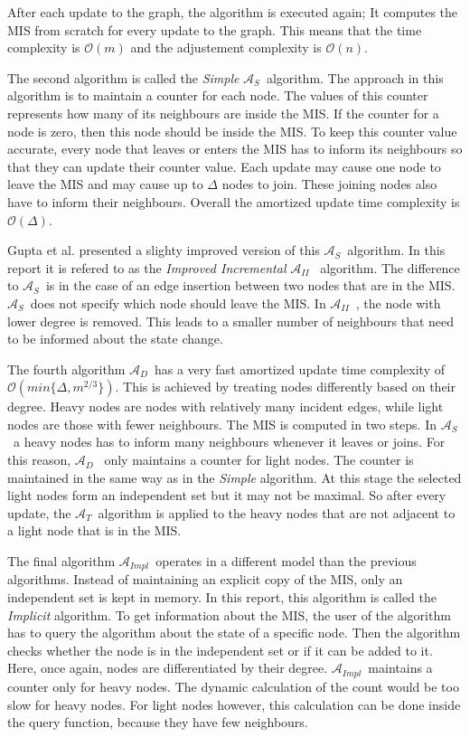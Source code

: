 \documentclass[letterpaper,11pt]{article}
\newcommand{\trivial}{$\mathcal{A}_T$\ }
\newcommand{\simple}{$\mathcal{A}_S$\ }
\newcommand{\improvedinc}{$\mathcal{A}_{II}$\ }
\newcommand{\dynamic}{$\mathcal{A}_{D}$\ }
\newcommand{\implicit}{$\mathcal{A}_{Impl}$\ }
\newcommand{\OD}{$\mathcal{O}(\Delta)$}
\begin{document}

After each update to the graph, the algorithm is executed again; It computes the
MIS from scratch for every update to the graph. This means that the time
complexity is $\mathcal{O}(m)$ and the adjustement complexity is
$\mathcal{O}(n)$.

The second algorithm is called the \textit{Simple} \simple algorithm. The
approach in this algorithm is to maintain a counter for each node. The values of
this counter represents how many of its neighbours are inside the MIS. If the
counter for a node is zero, then this node should be inside the MIS. To keep
this counter value accurate, every node that leaves or enters the MIS has to
inform its neighbours so that they can update their counter value. Each update
may cause one node to leave the MIS and may cause up to $\Delta$ nodes to join.
These joining nodes also have to inform their neighbours. Overall the amortized update
time complexity is \OD.

Gupta et al. presented a slighty improved version of this \simple algorithm. In
this report it is refered to as the \textit{Improved Incremental} \improvedinc
algorithm. The difference to \simple is in the case of an edge insertion between
two nodes that are in the MIS. \simple does not specify which node should leave
the MIS. In \improvedinc, the node with lower degree is removed. This leads to
a smaller number of neighbours that need to be informed about the state change.

The fourth algorithm \dynamic has a very fast amortized update time complexity
of \linebreak $\mathcal{O}(min\{\Delta, m^{2/3}\})$. This is achieved by
treating nodes differently based on their degree. Heavy nodes are nodes with
relatively many incident edges, while light nodes are those with fewer
neighbours. The MIS is computed in two steps. In \simple a heavy nodes has to
inform many neighbours whenever it leaves or joins. For this reason, \dynamic
only maintains a counter for light nodes. The counter is maintained in the same
way as in the \textit{Simple} algorithm. At this stage the selected light nodes
form an independent set but it may not be maximal. So after every update, the
\trivial algorithm is applied to the heavy nodes that are not adjacent to a
light node that is in the MIS.

The final algorithm \implicit operates in a different model than the previous
algorithms. Instead of maintaining an explicit copy of the MIS, only an
independent set is kept in memory. In this report, this algorithm is called the
\textit{Implicit} algorithm. To get information about the MIS, the user of the
algorithm has to query the algorithm about the state of a specific node. Then
the algorithm checks whether the node is in the independent set or if it can be
added to it. Here, once again, nodes are differentiated by their degree.
\implicit maintains a counter only for heavy nodes. The dynamic calculation of
the count would be too slow for heavy nodes. For light nodes however, this
calculation can be done inside the query function, because they have few
neighbours.
\end{document}
